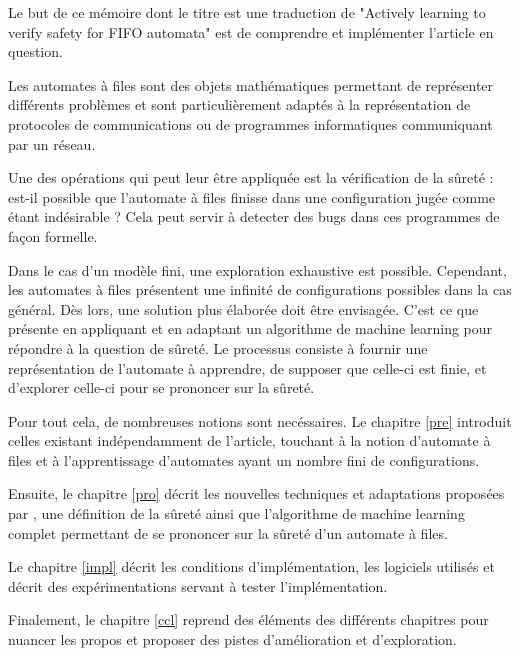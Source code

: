 Le but de ce mémoire dont le titre est une traduction de "Actively learning to verify safety for FIFO automata" \cite{Vardhan04} est de comprendre et implémenter l'article en question.

Les automates à files sont des objets mathématiques permettant de représenter différents problèmes et sont particulièrement adaptés à la représentation de protocoles de communications ou de programmes informatiques communiquant par un réseau.

Une des opérations qui peut leur être appliquée est la vérification de la sûreté : est-il possible que l'automate à files finisse dans une configuration jugée comme étant indésirable ? Cela peut servir à detecter des bugs dans ces programmes de façon formelle.

Dans le cas d'un modèle fini, une exploration exhaustive est possible. Cependant, les automates à files présentent une infinité de configurations possibles dans la cas général. Dès lors, une solution plus élaborée doit être envisagée. C'est ce que présente \cite{Vardhan04} en appliquant et en adaptant un algorithme de machine learning pour répondre à la question de sûreté. Le processus consiste à fournir une représentation de l'automate à apprendre, de supposer que celle-ci est finie, et d'explorer celle-ci pour se prononcer sur la sûreté.

Pour tout cela, de nombreuses notions sont necéssaires. Le chapitre \ref{pre} introduit celles existant indépendamment de l'article, touchant à la notion d'automate à files et à l'apprentissage d'automates ayant un nombre fini de configurations.

Ensuite, le chapitre \ref{pro} décrit les nouvelles techniques et adaptations proposées par \cite{Vardhan04}, une définition de la sûreté ainsi que l'algorithme de machine learning complet permettant de se prononcer sur la sûreté d'un automate à files.


Le chapitre \ref{impl} décrit les conditions d'implémentation, les logiciels utilisés et décrit des expérimentations servant à tester l'implémentation.

Finalement, le chapitre \ref{ccl} reprend des éléments des différents chapitres pour nuancer les propos et proposer des pistes d'amélioration et d'exploration.

